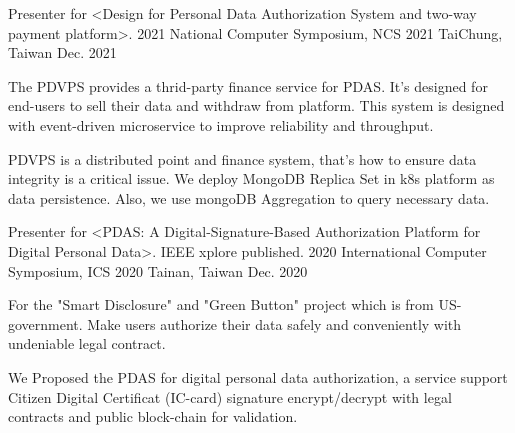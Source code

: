 \begin{cventries}
  \cventry
    {Presenter for <Design for Personal Data Authorization System and two-way payment platform>.} %
    {2021 National Computer Symposium, NCS 2021} %
    {TaiChung, Taiwan} %
    {Dec. 2021} %
    {
      \begin{cvitems} %
        \item {The PDVPS provides a thrid-party finance service for PDAS. It's designed for end-users to sell their data and withdraw from platform. This system is designed with event-driven microservice to improve reliability and throughput.}
        \item {PDVPS is a distributed point and finance system, that's how to ensure data integrity is a critical issue. We deploy MongoDB Replica Set in k8s platform as data persistence. Also, we use mongoDB Aggregation to query necessary data.}
      \end{cvitems}
    }

  \cventry
    {Presenter for <PDAS: A Digital-Signature-Based Authorization Platform for Digital Personal Data>. IEEE xplore published.} %
    {2020 International Computer Symposium, ICS 2020} %
    {Tainan, Taiwan} %
    {Dec. 2020} %
    {
      \begin{cvitems} %
        \item {For the "Smart Disclosure" and "Green Button" project which is from US-government. Make users authorize their data safely and conveniently with undeniable legal contract.}
        \item {We Proposed the PDAS for digital personal data authorization, a service support Citizen Digital Certificat (IC-card) signature encrypt/decrypt with legal contracts and public block-chain for validation.}
      \end{cvitems}
    }

\end{cventries}
